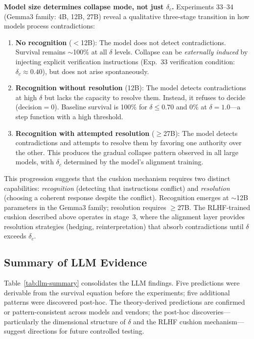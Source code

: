 \documentclass[11pt,a4paper]{article}
\begin{document}
\textbf{Model size determines collapse mode, not just $\delta_c$.} Experiments 33--34 (Gemma3 family: 4B, 12B, 27B) reveal a qualitative three-stage transition in how models process contradictions:

\begin{enumerate}
    \item \textbf{No recognition} ($<$12B): The model does not detect contradictions. Survival remains $\sim$100\% at all $\delta$ levels. Collapse can be \emph{externally induced} by injecting explicit verification instructions (Exp.~33 verification condition: $\delta_c \approx 0.40$), but does not arise spontaneously.

    \item \textbf{Recognition without resolution} (12B): The model detects contradictions at high $\delta$ but lacks the capacity to resolve them. Instead, it refuses to decide (decision${}= 0$). Baseline survival is 100\% for $\delta \leq 0.70$ and 0\% at $\delta = 1.0$---a step function with a high threshold.

    \item \textbf{Recognition with attempted resolution} ($\geq$27B): The model detects contradictions and attempts to resolve them by favoring one authority over the other. This produces the gradual collapse pattern observed in all large models, with $\delta_c$ determined by the model's alignment training.
\end{enumerate}

This progression suggests that the cushion mechanism requires two distinct capabilities: \emph{recognition} (detecting that instructions conflict) and \emph{resolution} (choosing a coherent response despite the conflict). Recognition emerges at $\sim$12B parameters in the Gemma3 family; resolution requires $\geq$27B. The RLHF-trained cushion described above operates in stage~3, where the alignment layer provides resolution strategies (hedging, reinterpretation) that absorb contradictions until $\delta$ exceeds $\delta_c$.

\subsection{Summary of LLM Evidence}

Table~\ref{tab:llm-summary} consolidates the LLM findings. Five predictions were derivable from the survival equation before the experiments; five additional patterns were discovered post-hoc. The theory-derived predictions are confirmed or pattern-consistent across models and vendors; the post-hoc discoveries---particularly the dimensional structure of $\delta$ and the RLHF cushion mechanism---suggest directions for future controlled testing.
\end{document}
